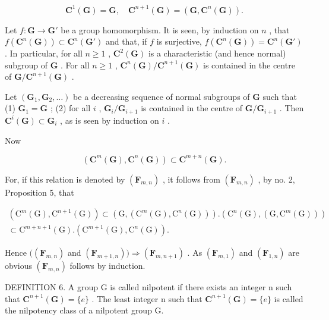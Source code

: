 \[
\mathbf {C} ^ {1} (\mathbf {G}) = \mathbf {G}, \quad \mathbf {C} ^ {n + 1} (\mathbf {G}) = (\mathbf {G}, \mathbf {C} ^ {n} (\mathbf {G})).
\]

Let \(f: \mathbf{G} \to \mathbf{G}'\) be a group homomorphism. It is seen, by induction on \(n\) , that \(f(\mathbf{C}^n(\mathbf{G})) \subset \mathbf{C}^n(\mathbf{G}')\) and that, if \(f\) is surjective, \(f(\mathbf{C}^n(\mathbf{G})) = \mathbf{C}^n(\mathbf{G}')\) . In particular, for all \(n \geqslant 1\) , \(\mathbf{C}^2(\mathbf{G})\) is a characteristic (and hence normal) subgroup of \(\mathbf{G}\) . For all \(n \geqslant 1\) , \(\mathbf{C}^n(\mathbf{G}) / \mathbf{C}^{n+1}(\mathbf{G})\) is contained in the centre of \(\mathbf{G} / \mathbf{C}^{n+1}(\mathbf{G})\) .

Let \((\mathbf{G}_1, \mathbf{G}_2, \ldots)\) be a decreasing sequence of normal subgroups of \(\mathbf{G}\) such that (1) \(\mathbf{G}_1 = \mathbf{G}\) ; (2) for all \(i\) , \(\mathbf{G}_i / \mathbf{G}_{i+1}\) is contained in the centre of \(\mathbf{G} / \mathbf{G}_{i+1}\) . Then \(\mathbf{C}^i(\mathbf{G}) \subset \mathbf{G}_i\) , as is seen by induction on \(i\) .

Now

\[
\left(\mathbf {C} ^ {m} (\mathbf {G}), \mathbf {C} ^ {n} (\mathbf {G})\right) \subset \mathbf {C} ^ {m + n} (\mathbf {G}).\tag{7}
\]

For, if this relation is denoted by \((\mathbf{F}_{m,n})\) , it follows from \((\mathbf{F}_{m,n})\) , by no. 2, Proposition 5, that

\[
\begin{array}{l} \left(\mathrm{C} ^ {m} (\mathrm{G}), \mathrm{C} ^ {n + 1} (\mathrm{G})\right) \subset \left(\mathrm{G}, \left(\mathrm{C} ^ {m} (\mathrm{G}), \mathrm{C} ^ {n} (\mathrm{G})\right)\right). \left(\mathrm{C} ^ {n} (\mathrm{G}), \left(\mathrm{G}, \mathrm{C} ^ {m} (\mathrm{G})\right)\right) \\ \subset \mathrm{C} ^ {m + n + 1} (\mathrm{G}). \left(\mathrm{C} ^ {m + 1} (\mathrm{G}), \mathrm{C} ^ {n} (\mathrm{G})\right). \end{array}
\]

Hence \(((\mathbf{F}_{m,n})\) and \((\mathbf{F}_{m + 1,n}))\Rightarrow (\mathbf{F}_{m,n + 1})\) . As \((\mathbf{F}_{m,1})\) and \((\mathbf{F}_{1,n})\) are obvious \((\mathbf{F}_{m,n})\) follows by induction.

DEFINITION 6. A group G is called nilpotent if there exists an integer n such that \(\mathbf{C}^{n+1}(\mathbf{G}) = \{e\}\) . The least integer n such that \(\mathbf{C}^{n+1}(\mathbf{G}) = \{e\}\) is called the nilpotency class of a nilpotent group G.


